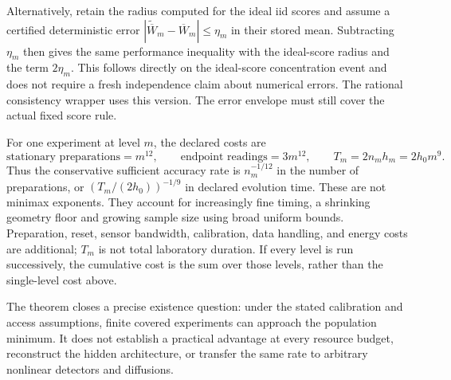 Alternatively, retain the radius computed for the ideal iid scores and
assume a certified deterministic error
$|\widetilde{\overline W}_m-\overline W_m|\leq\eta_m$ in their stored
mean. Subtracting $\eta_m$ then gives the same performance inequality with
the ideal-score radius and the term $2\eta_m$. This follows directly on
the ideal-score concentration event and does not require a fresh independence
claim about numerical errors. The rational consistency wrapper uses this
version. The error envelope must still cover the actual fixed score rule.

For one experiment at level $m$, the declared costs are
\begin{equation}
 \text{stationary preparations}=m^{12},\qquad
 \text{endpoint readings}=3m^{12},\qquad
 T_m=2n_mh_m=2h_0m^9.
 \label{eq:og-consistency-resources}
\end{equation}
Thus the conservative sufficient accuracy rate is $n_m^{-1/12}$ in the
number of preparations, or $(T_m/(2h_0))^{-1/9}$ in declared evolution
time. These are not minimax exponents. They account for increasingly fine
timing, a shrinking geometry floor and growing sample size using broad
uniform bounds. Preparation, reset, sensor bandwidth, calibration,
data handling, and energy costs are additional; $T_m$ is not total
laboratory duration. If every level is run successively, the cumulative
cost is the sum over those levels, rather than the single-level cost above.

The theorem closes a precise existence question: under the stated
calibration and access assumptions, finite covered experiments can approach
the population minimum. It does not establish a practical advantage at
every resource budget, reconstruct the hidden architecture, or transfer the
same rate to arbitrary nonlinear detectors and diffusions.
